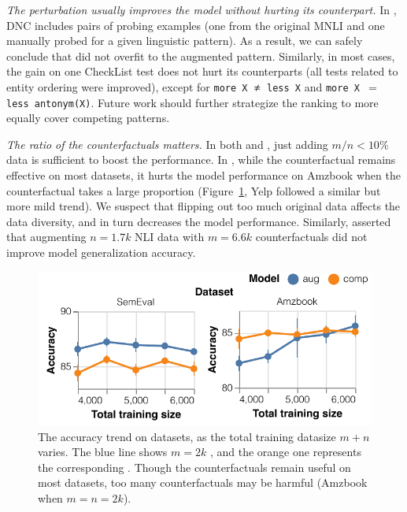 \emph{The perturbation usually improves the model without hurting its counterpart.}
In \nli, DNC includes pairs of probing examples (one from the original MNLI and one manually probed for a given linguistic pattern).
As a result, we can safely conclude that \nli did not overfit to the augmented pattern.
Similarly, in most \qqp cases, the gain on one CheckList test does not hurt its counterparts (\eg all tests related to entity ordering were improved), except for \texttt{more X $\not\eq$ less X} and \texttt{more X $=$ less antonym(X)}.
Future work should further strategize the ranking to more equally cover competing patterns. 

\emph{The ratio of the counterfactuals matters. }
In both \nli and \qqp, just adding $m/n < 10\%$ data is sufficient to boost the performance.
In \sst, while the counterfactual remains effective on most datasets, it hurts the model performance on Amzbook when the counterfactual takes a large proportion (Figure~\ref{fig:sst_trend}, Yelp followed a similar but more mild trend).
We suspect that flipping out too much original data affects the data diversity, and in turn decreases the model performance.
Similarly, \citet{huang2020counterfactually} asserted that augmenting $n=1.7k$ NLI data with $m=6.6k$ counterfactuals did not improve model generalization accuracy.




\begin{figure}[t]
\centering
\includegraphics[width=1\columnwidth]{figures/sst_trend_2}
\vspace{-15pt}
\caption{The accuracy trend on \sst datasets, as the total training datasize $m+n$ varies. The blue line shows $m=2k$ \maug, and the orange one represents the corresponding \mcomp.
Though the counterfactuals remain useful on most datasets, too many counterfactuals may be harmful (\eg Amzbook when $m=n=2k$).
}
\vspace{-10pt}
\label{fig:sst_trend}
\end{figure}





